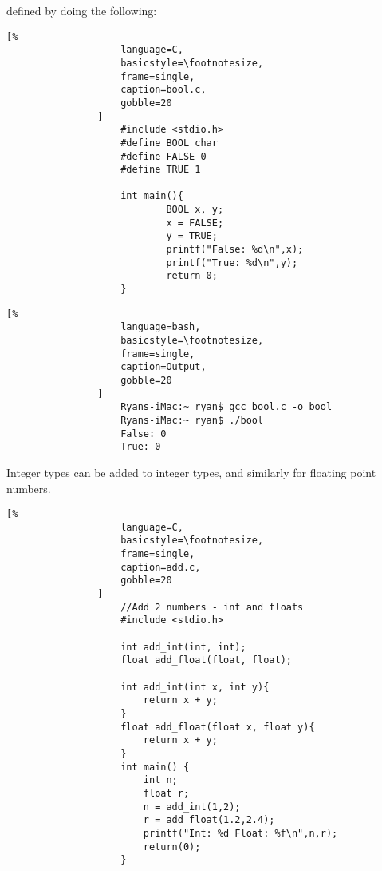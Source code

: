 \documentclass[crop=false,class=article,oneside]{standalone}
\begin{document}
            defined by doing the following:
            \newline
            \begin{minipage}[t]{.48\textwidth}
                \centering
                \begin{lstlisting}[%
                    language=C,
                    basicstyle=\footnotesize,
                    frame=single,
                    caption=bool.c,
                    gobble=20
                ]
                    #include <stdio.h>
                    #define BOOL char
                    #define FALSE 0
                    #define TRUE 1
                    
                    int main(){
                            BOOL x, y;
                            x = FALSE;
                            y = TRUE;
                            printf("False: %d\n",x);
                            printf("True: %d\n",y);
                            return 0;
                    }
                \end{lstlisting}
            \end{minipage}\hfill
            \begin{minipage}[t]{.48\textwidth}
                \centering
                \begin{lstlisting}[%
                    language=bash,
                    basicstyle=\footnotesize,
                    frame=single,
                    caption=Output,
                    gobble=20
                ]
                    Ryans-iMac:~ ryan$ gcc bool.c -o bool
                    Ryans-iMac:~ ryan$ ./bool
                    False: 0
                    True: 0
                \end{lstlisting}
            \end{minipage}
            Integer types can be added to integer types,
            and similarly for floating point numbers.\newline
            \begin{minipage}[t]{.48\textwidth}
                \centering
                \begin{lstlisting}[%
                    language=C,
                    basicstyle=\footnotesize,
                    frame=single,
                    caption=add.c,
                    gobble=20
                ]
                    //Add 2 numbers - int and floats
                    #include <stdio.h>
                    
                    int add_int(int, int);
                    float add_float(float, float);
                    
                    int add_int(int x, int y){
                        return x + y;
                    }
                    float add_float(float x, float y){
                        return x + y;
                    }
                    int main() {
                        int n;
                        float r;
                        n = add_int(1,2);
                        r = add_float(1.2,2.4);
                        printf("Int: %d Float: %f\n",n,r);
                        return(0);
                    }
                \end{lstlisting}
            \end{minipage}\hfill
\end{document}

